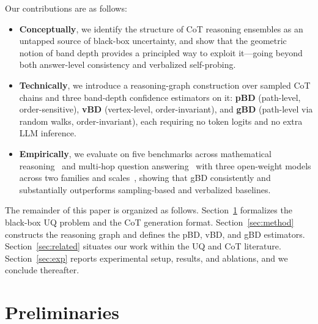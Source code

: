 \documentclass[letterpaper]{article} %
\begin{document}
Our contributions are as follows:
\begin{itemize}
  \item \textbf{Conceptually}, we identify the structure of CoT reasoning
        ensembles as an untapped source of black-box uncertainty, and show that
        the geometric notion of band depth provides a principled way to exploit
        it---going beyond both answer-level consistency and verbalized
        self-probing.
  \item \textbf{Technically}, we introduce a reasoning-graph construction over
        sampled CoT chains and three band-depth confidence estimators on it:
        \textbf{pBD} (path-level, order-sensitive), \textbf{vBD} (vertex-level,
        order-invariant), and \textbf{gBD} (path-level via random walks,
        order-invariant), each requiring no token logits and no extra LLM
        inference.
  \item \textbf{Empirically}, we evaluate on five benchmarks across mathematical
        reasoning~\citep{cobbe2021gsm8k, patel2021svamp, miao2020asdiv} and
        multi-hop question answering~\citep{yang2018hotpotqa, ho2020wikimultihop}
        with three open-weight models across two families and
        scales~\citep{touvron2023llama2, grattafiori2024llama3, qwen2024qwen25},
        showing that gBD consistently and substantially outperforms
        sampling-based and verbalized baselines.
\end{itemize}

The remainder of this paper is organized as follows. Section~\ref{sec:prelim}
formalizes the black-box UQ problem and the CoT generation format.
Section~\ref{sec:method} constructs the reasoning graph and defines the pBD,
vBD, and gBD estimators. Section~\ref{sec:related} situates our work within the
UQ and CoT literature. Section~\ref{sec:exp} reports experimental setup,
results, and ablations, and we conclude thereafter.

\section{Preliminaries}
\label{sec:prelim}
\end{document}
